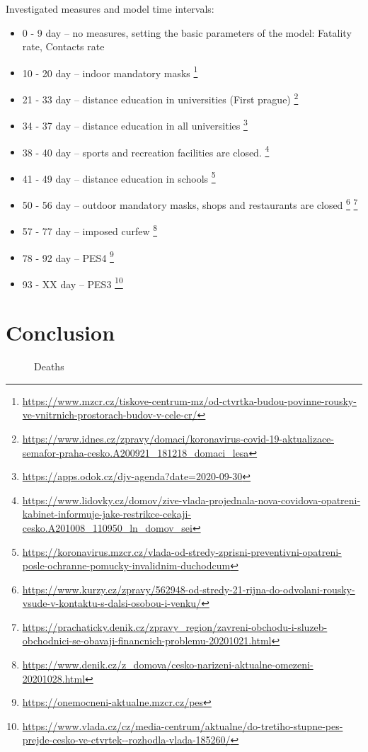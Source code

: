 \documentclass[12pt,a4paper,english]{article}
\begin{document}
    Investigated measures and model time intervals:
    \begin{itemize}
        \item 0 - 9   day -- no measures, setting the basic parameters of the model: Fatality rate, Contacts rate
        \item 10 - 20 day -- indoor mandatory  masks \footnote{\url{https://www.mzcr.cz/tiskove-centrum-mz/od-ctvrtka-budou-povinne-rousky-ve-vnitrnich-prostorach-budov-v-cele-cr/}}
        \item 21 - 33 day -- distance education in universities (First prague) \footnote{\url{https://www.idnes.cz/zpravy/domaci/koronavirus-covid-19-aktualizace-semafor-praha-cesko.A200921_181218_domaci_lesa}}
        \item 34 - 37 day -- distance education in all universities  \footnote{\url{https://apps.odok.cz/djv-agenda?date=2020-09-30}}
        \item 38 - 40 day -- sports and recreation facilities are closed. \footnote{\url{https://www.lidovky.cz/domov/zive-vlada-projednala-nova-covidova-opatreni-kabinet-informuje-jake-restrikce-cekaji-cesko.A201008\_110950\_ln\_domov\_sei}}
        \item 41 - 49 day -- distance education in schools \footnote{\url{https://koronavirus.mzcr.cz/vlada-od-stredy-zprisni-preventivni-opatreni-posle-ochranne-pomucky-invalidnim-duchodcum}}
        \item 50 - 56 day -- outdoor mandatory masks, shops and restaurants are closed \footnote{\url{https://www.kurzy.cz/zpravy/562948-od-stredy-21-rijna-do-odvolani-rousky-vsude-v-kontaktu-s-dalsi-osobou-i-venku/}} \footnote{\url{https://prachaticky.denik.cz/zpravy_region/zavreni-obchodu-i-sluzeb-obchodnici-se-obavaji-financnich-problemu-20201021.html}}
        \item 57 - 77 day -- imposed curfew \footnote{\url{https://www.denik.cz/z_domova/cesko-narizeni-aktualne-omezeni-20201028.html}}
        \item 78 - 92 day -- PES4 \footnote{\url{https://onemocneni-aktualne.mzcr.cz/pes}}
        \item 93 - XX day -- PES3 \footnote{\url{https://www.vlada.cz/cz/media-centrum/aktualne/do-tretiho-stupne-pes-prejde-cesko-ve-ctvrtek--rozhodla-vlada-185260/}}
    \end{itemize}
    
    \newpage
    \section{Conclusion} 
    \begin{figure}[H]
        \centering
        \hfill
        \caption{Deaths}
    \end{figure}
\end{document}
